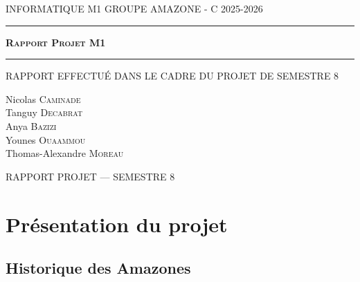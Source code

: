\documentclass[11pt,a4paper,titlepage,oneside]{article}
\begin{document}
    \begin{titlepage}
        \selectfont
        \begin{center}\normalsize
            \MakeUppercase{Informatique M1 \hfill Groupe Amazone - C \hfill 2025-2026}
        \end{center}
        \vspace*{0.1cm}
        \hrule
        \vspace*{0.2cm}
        \vspace*{2cm}
        \begin{center}\Huge
            \textsc{\textbf{Rapport Projet M1}}
        \end{center}
        \hrule
        \begin{center}
            \MakeUppercase{Rapport effectué dans le cadre du projet de semestre 8}
        \end{center}
        \vspace*{2cm}
        \begin{center}\Large
            Nicolas \textsc{Caminade}\\ \vspace{0.3cm}
            Tanguy \textsc{Decabrat}\\ \vspace{0.3cm}
            Anya \textsc{Bazizi}\\ \vspace{0.3cm}
            Younes \textsc{Ouaammou}\\ \vspace{0.3cm}
            Thomas-Alexandre \textsc{Moreau}
        \end{center}
        \vfill
        \begin{center}\normalsize
            \MakeUppercase{Rapport Projet --- Semestre 8}
        \end{center}
    \end{titlepage}

    \newpage
    \renewcommand{\contentsname}{Sommaire}
    \setcounter{tocdepth}{3} 
    \tableofcontents

    
    
\newpage
    \section{Présentation du projet}
\subsection{Historique des Amazones}
\end{document}
